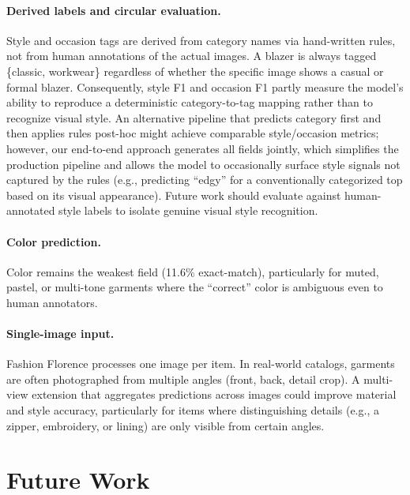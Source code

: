 \documentclass[10pt,twocolumn]{article}
\begin{document}
\paragraph{Derived labels and circular evaluation.}
Style and occasion tags are derived from category names via hand-written
rules, not from human annotations of the actual images.  A blazer is always
tagged \{classic, workwear\} regardless of whether the specific image shows a
casual or formal blazer.  Consequently, style F1 and occasion F1 partly
measure the model's ability to reproduce a deterministic category-to-tag
mapping rather than to recognize visual style.  An alternative pipeline
that predicts category first and then applies rules post-hoc might achieve
comparable style/occasion metrics; however, our end-to-end approach
generates all fields jointly, which simplifies the production pipeline and
allows the model to occasionally surface style signals not captured by the
rules (e.g., predicting ``edgy'' for a conventionally categorized top based
on its visual appearance).  Future work should evaluate against
human-annotated style labels to isolate genuine visual style recognition.

\paragraph{Color prediction.}
Color remains the weakest field (11.6\% exact-match), particularly for
muted, pastel, or multi-tone garments where the ``correct'' color is
ambiguous even to human annotators.

\paragraph{Single-image input.}
Fashion Florence processes one image per item.  In real-world catalogs,
garments are often photographed from multiple angles (front, back, detail
crop).  A multi-view extension that aggregates predictions across images
could improve material and style accuracy, particularly for items where
distinguishing details (e.g., a zipper, embroidery, or lining) are only
visible from certain angles.

\section{Future Work}
\label{sec:future}
\end{document}
